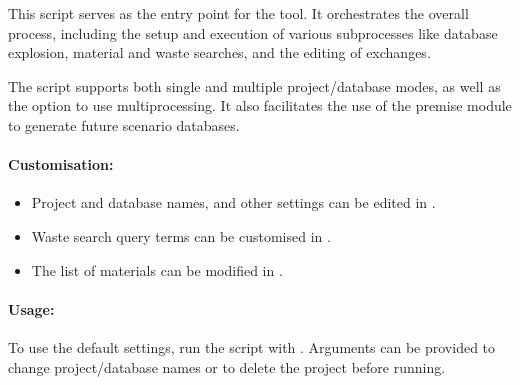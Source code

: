 \documentclass[letterpaper,10pt,english]{sphinxmanual}
\begin{document}
\sphinxAtStartPar
This script serves as the entry point for the  tool. It orchestrates the overall process, including the setup and execution of various subprocesses like database explosion, material and waste searches, and the editing of exchanges.

\sphinxAtStartPar
The script supports both single and multiple project/database modes, as well as the option to use multiprocessing. It also facilitates the use of the premise module to generate future scenario databases.


\paragraph{Customisation:}
\label{\detokenize{WMFootprint_api:customisation}}\begin{itemize}
\item {} 
\sphinxAtStartPar
Project and database names, and other settings can be edited in .

\item {} 
\sphinxAtStartPar
Waste search query terms can be customised in .

\item {} 
\sphinxAtStartPar
The list of materials can be modified in .

\end{itemize}


\paragraph{Usage:}
\label{\detokenize{WMFootprint_api:usage}}
\sphinxAtStartPar
To use the default settings, run the script with . 
Arguments can be provided to change project/database names or to delete the project before running.
\end{document}
